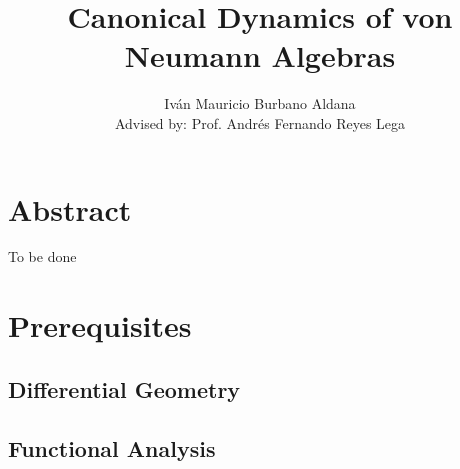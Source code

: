 \documentclass{book}
\title{Canonical Dynamics of von Neumann Algebras}
\author{Iván Mauricio Burbano Aldana\\
Advised by: Prof. Andrés Fernando Reyes Lega}
\begin{document}
\maketitle

\chapter*{Abstract}

To be done

\tableofcontents

\chapter{Prerequisites}

\section{Differential Geometry}

  

\section{Functional Analysis}


\end{document}
